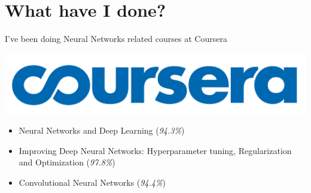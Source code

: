 
\section{What have I done?}

\begin{frame}{\insertsec}
    
    I've been doing Neural Networks related courses at Coursera

    \begin{center}
        \includegraphics[width=.5\textwidth]{images/coursera_logo}
    \end{center}

    \begin{itemize}
        \item Neural Networks and Deep Learning (\emph{94.3\%})
        \item Improving Deep Neural Networks: Hyperparameter tuning, Regularization and 
        Optimization (\emph{97.8\%})
        \item Convolutional Neural Networks (\emph{94.4\%})
    \end{itemize}
\end{frame}


